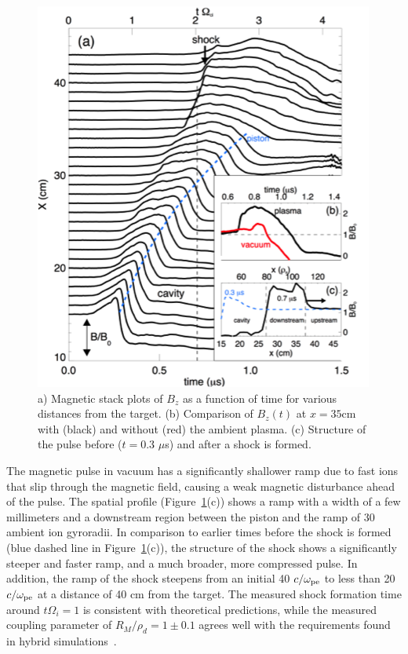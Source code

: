\documentclass[11pt]{article}
\renewcommand{\cite}{\citep}
\begin{document}
\begin{figure}
\begin{center}
\includegraphics[width=3.2truein]{shock1}
\caption{\small a) Magnetic stack plots of $B_{z}$ as a function of time for
  various distances from the target. (b) Comparison of $B_z(t)$ at $x
  = 35$cm with (black) and without (red) the ambient plasma. (c) Structure
  of the pulse before ($t = 0.3$ $\mu$s) and after a shock is formed.}\label{shock1}
\end{center}
\end{figure}
The magnetic pulse
in vacuum has a significantly shallower ramp due to fast ions that slip
through the magnetic field, causing a weak magnetic disturbance ahead of
the pulse. The spatial profile (Figure~\ref{shock1}(c)) shows a ramp with a width of
a few millimeters and a downstream region between the piston and the
ramp of 30 ambient ion gyroradii. In comparison to earlier times before
the shock is formed (blue dashed line in Figure~\ref{shock1}(c)), the structure of
the shock shows a significantly steeper and faster ramp, and a much
broader, more compressed pulse. In addition, the ramp of the shock
steepens from an initial 40 $c/\omega_{\rm pe}$ to less
than 20 $c/\omega_{\rm pe}$ at a distance of 40 cm from
the target. The measured shock formation time around
$t \Omega_{i} = 1$ is consistent with theoretical
predictions, while the measured coupling parameter of
$R_M/\rho_d = 1 \pm 0.1$ agrees
well with the requirements found in hybrid simulations~\cite{clark:2014}.
\end{document}
